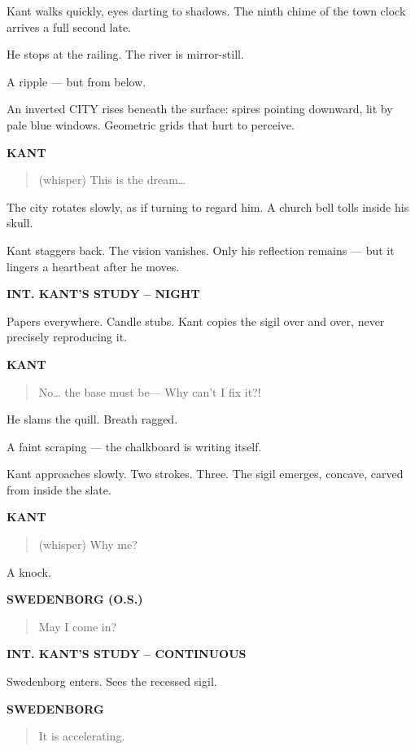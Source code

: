\documentclass[12pt]{article}
\newcommand{\Scene}[1]{\vspace{1.2em}\textbf{#1}\vspace{0.8em}}
\newcommand{\Character}[1]{\vspace{0.8em}\textbf{#1}\vspace{0.4em}}
\newenvironment{Dialogue}{\begin{quote}\begin{RaggedRight}}{\end{RaggedRight}\end{quote}}
\newcommand{\Action}[1]{\vspace{0.4em}#1\vspace{0.4em}}
\begin{document}
\Action{Kant walks quickly, eyes darting to shadows.  
The ninth chime of the town clock arrives a full second late.}

\Action{He stops at the railing.  
The river is mirror-still.}

\Action{A ripple —  
but from below.}

\Action{An inverted CITY rises beneath the surface:  
spires pointing downward, lit by pale blue windows.  
Geometric grids that hurt to perceive.}

\Character{KANT}
\begin{Dialogue}
(whisper)  
This is the dream…
\end{Dialogue}

\Action{The city rotates slowly, as if turning to regard him.  
A church bell tolls inside his skull.}

\Action{Kant staggers back.  
The vision vanishes.  
Only his reflection remains —  
but it lingers a heartbeat after he moves.}

\Scene{INT. KANT’S STUDY – NIGHT}

\Action{Papers everywhere. Candle stubs.  
Kant copies the sigil over and over, never precisely reproducing it.}

\Character{KANT}
\begin{Dialogue}
No… the base must be—  
Why can’t I fix it?!
\end{Dialogue}

\Action{He slams the quill. Breath ragged.}

\Action{A faint scraping —  
the chalkboard is writing itself.}

\Action{Kant approaches slowly.  
Two strokes.  
Three.  
The sigil emerges, concave, carved from inside the slate.}

\Character{KANT}
\begin{Dialogue}
(whisper)  
Why me?
\end{Dialogue}

\Action{A knock.}

\Character{SWEDENBORG (O.S.)}
\begin{Dialogue}
May I come in?
\end{Dialogue}

\Scene{INT. KANT’S STUDY – CONTINUOUS}

\Action{Swedenborg enters. Sees the recessed sigil.}

\Character{SWEDENBORG}
\begin{Dialogue}
It is accelerating.
\end{Dialogue}
\end{document}
